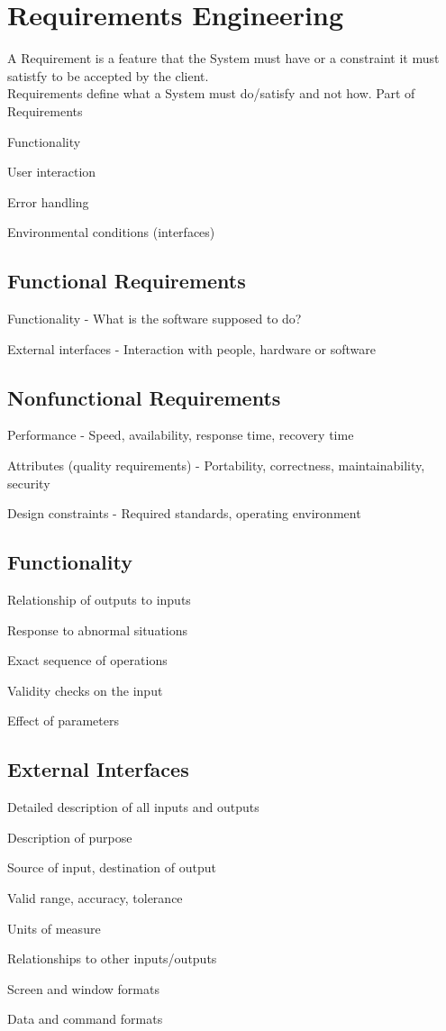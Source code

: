 \section{Requirements Engineering}
A Requirement is a feature that the System must have or a constraint it must satistfy to be accepted by the client.\\
Requirements define what a System must do/satisfy and not how.
Part of Requirements
\enumstart
	\item Functionality
	\item User interaction
	\item Error handling
	\item Environmental conditions (interfaces)
\enumend

\subsection{Functional Requirements}
\enumstart
	\item Functionality - What is the software supposed to do?
	\item External interfaces - Interaction with people, hardware or software
\enumend

\subsection{Nonfunctional Requirements}
\enumstart
	\item Performance - Speed, availability, response time, recovery time
	\item Attributes (quality requirements) - Portability, correctness, maintainability, security
	\item Design constraints - Required standards, operating environment
\enumend

\subsection{Functionality}
\enumstart
	\item Relationship of outputs to inputs
	\item Response to abnormal situations
	\item Exact sequence of operations
	\item Validity checks on the input
	\item Effect of parameters
\enumend

\subsection{External Interfaces}
Detailed description of all inputs and outputs
\enumstart
	\item Description of purpose
	\item Source of input, destination of output
	\item Valid range, accuracy, tolerance
	\item Units of measure
	\item Relationships to other inputs/outputs
	\item Screen and window formats
	\item Data and command formats
\enumend

